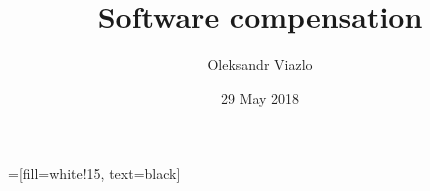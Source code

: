 \documentclass[8pt]{beamer}
\newif\ifplacelogo %
\begin{document}
\newcommand{\myNode}{\tikz[baseline,inner sep=1pt] \node[anchor=base]}

 =[fill=white!15, text=black]



\title[Software compensation \hspace{19.0em}\insertframenumber/
\inserttotalframenumber]{ Software compensation }


	\author[Oleksandr Viazlo]{Oleksandr Viazlo\\ 
	{\small }
	}
	
       
	\date{29 May 2018}


	

   	

\placelogofalse
\end{document}
